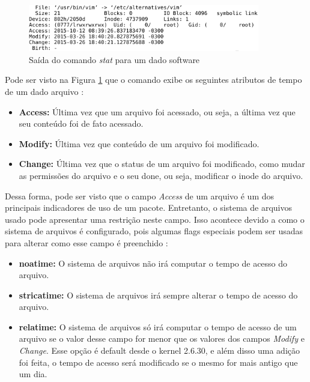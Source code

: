 \begin{figure}[h]
  \centering
  \includegraphics[width=0.9\textwidth]{figuras/comando_stat.eps}
  \caption{Saída do comando \textit{stat} para um dado software}
  \label{fig:comando_stat}
\end{figure}

Pode ser visto na Figura \ref{fig:comando_stat} que o comando exibe os seguintes
atributos de tempo de um dado arquivo \cite{1_haas}:

\begin{itemize}
    \item \textbf{Access:} Última vez que um arquivo foi acessado, ou seja, a
        última vez que seu conteúdo foi de fato acessado.
    \item \textbf{Modify:} Última vez que conteúdo de um arquivo foi modificado.
    \item \textbf{Change:} Última vez que o status de um arquivo foi modificado,
        como mudar as permissões do arquivo e o seu done, ou seja, modificar o
        inode do arquivo.
\end{itemize}

Dessa forma, pode ser visto que o campo \textit{Access} de um arquivo é um dos
principais indicadores de uso de um pacote. Entretanto, o sistema de arquivos
usado pode apresentar uma
restrição neste campo. Isso acontece devido a como o sistema de arquivos é
configurado, pois algumas flags especiais podem ser usadas para alterar como
esse campo é preenchido \cite{2_wiki.debian.org}:

\begin{itemize}
    \item \textbf{noatime:} O sistema de arquivos não irá computar o tempo de
        acesso do arquivo.
    \item \textbf{stricatime:} O sistema de arquivos irá sempre alterar o tempo
        de acesso do arquivo.
    \item \textbf{relatime:} O sistema de arquivos só irá computar o tempo de
        acesso de um arquivo se o valor desse campo for menor que os valores dos
        campos \textit{Modify} e \textit{Change}. Esse opção é default desde
        o kernel 2.6.30, e além disso uma adição foi feita, o tempo de acesso será
        modificado se o mesmo for mais antigo que um dia.
\end{itemize}

